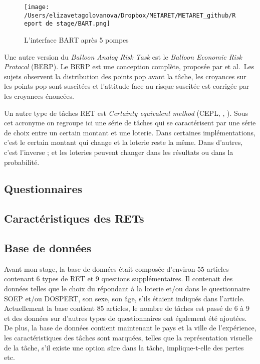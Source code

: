 \documentclass[12pt]{article}
\begin{document}
\begin{figure}
\centering
\texttt{[image: /Users/elizavetagolovanova/Dropbox/METARET/METARET\_github/Report de stage/BART.png]}
\caption{L'interface BART après 5 pompes}
\end{figure}

Une autre version du \emph{Balloon Analog Risk Task} est le
\emph{Balloon Economic Risk Protocol} (BERP). Le BERP est une conception
complète, proposée par \citet{Fairley2019} et al.~Les sujets observent
la distribution des points pop avant la tâche, les croyances sur les
points pop sont suscitées et l'attitude face au risque suscitée est
corrigée par les croyances énoncées.

Un autre type de tâches RET est \emph{Certainty equivalent method}
(CEPL, \citet{Menkhoff_Sakha_2017}, \citet{Csermely2014}). Sous cet
acronyme on regroupe ici une série de tâches qui se caractérisent par
une série de choix entre un certain montant et une loterie. Dans
certaines implémentations, c'est le certain montant qui change et la
loterie reste la même. Dans d'autres, c'est l'inverse ; et les loteries
peuvent changer dans les résultats ou dans la probabilité.

\subsection{Questionnaires}

\subsection{Caractéristiques des RETs}

\subsection{Base de données}

Avant mon stage, la base de données était composée d'environ 55 articles
contenant 6 types de RET et 9 questions supplémentaires. Il contenait
des données telles que le choix du répondant à la loterie et/ou dans le
questionnaire SOEP et/ou DOSPERT, son sexe, son âge, s'ils étaient
indiqués dans l'article. Actuellement la base contient 85 articles, le
nombre de tâches est passé de 6 à 9 et des données sur d'autres types de
questionnaires ont également été ajoutées. De plus, la base de données
contient maintenant le pays et la ville de l'expérience, les
caractéristiques des tâches sont marquées, telles que la représentation
visuelle de la tâche, s'il existe une option sûre dans la tâche,
implique-t-elle des pertes etc.
\end{document}
